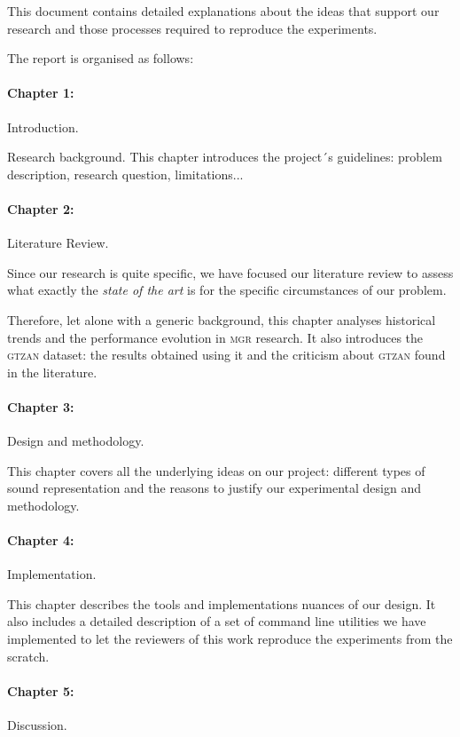 This document contains detailed explanations about the ideas that support our research and those processes required to reproduce the experiments.

The report is organised as follows:

\paragraph{Chapter 1:} Introduction.

Research background. This chapter introduces the project´s guidelines: problem description, research question, limitations...

\paragraph{Chapter 2:} Literature Review.

Since our research is quite specific, we have focused our literature review to assess what exactly the {\it state of the art} is for the specific circumstances of our problem.

Therefore, let alone with a generic background, this chapter analyses historical trends and the performance evolution in \textsc{mgr} research. It also introduces the \textsc{gtzan} dataset: the results obtained using it and the criticism about \textsc{gtzan} found in the literature.

\paragraph{Chapter 3:} Design and methodology.

This chapter covers all the underlying ideas on our project: different types of sound representation and the reasons to justify our experimental design and methodology.

\paragraph{Chapter 4:} Implementation.

This chapter describes the tools and implementations nuances of our design. It also includes a detailed description of a set of command line utilities we have implemented to let the reviewers of this work reproduce the experiments from the scratch.

\paragraph{Chapter 5:} Discussion.

